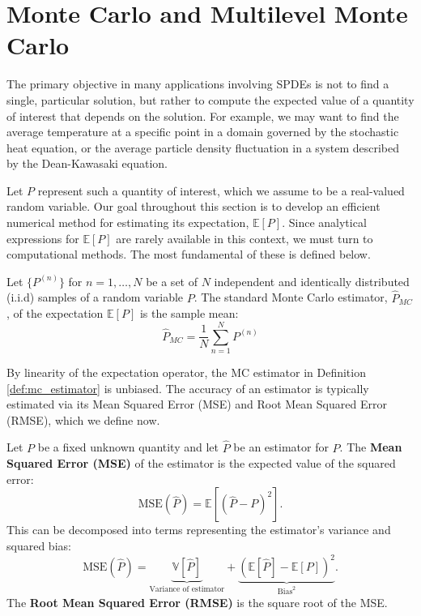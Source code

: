 \section{Monte Carlo and Multilevel Monte Carlo}\label{sec:intro_mlmc}

The primary objective in many applications involving SPDEs is not to find 
a single, particular solution, but rather to compute the expected value of a quantity of 
interest that depends on the solution. For example, we may 
want to find the average temperature at a specific point in a domain 
governed by the stochastic heat equation, or the average particle density fluctuation
in a system described by the Dean-Kawasaki equation.

Let $P$ represent such a quantity of interest, which we assume to be a real-valued 
random variable. Our goal throughout this section is to develop an efficient numerical
method for estimating its expectation, $\mathbb{E}[P]$. Since 
analytical expressions for $\mathbb{E}[P]$ are rarely available in this context, we must 
turn to computational methods. The most fundamental of these is defined below.

\begin{definition}\label{def:mc_estimator}
    Let $\{P^{(n)}\}$ for $n = 1, \dots, N$ be a set of $N$ independent and identically
    distributed (i.i.d) samples of a random variable $P$. The standard Monte Carlo estimator,
    $\hat{P}_{MC}$, of the expectation $\mathbb{E}[P]$ is the sample mean:
    \[
    \hat{P}_{MC} = \frac{1}{N} \sum_{n=1}^N P^{(n)}
    \]
\end{definition}

By linearity of the expectation operator, the MC estimator in Definition \ref{def:mc_estimator} 
is unbiased. The accuracy of an estimator is typically estimated via its Mean Squared Error (MSE) and 
Root Mean Squared Error (RMSE), which we define now.

\begin{definition}\label{def:mse_rmse}
    Let $P$ be a fixed unknown quantity and let $\hat{P}$ be an estimator for $P$. 
    The \textbf{Mean Squared Error (MSE)} of the estimator is the expected value of 
    the squared error:
    \[
    \text{MSE}(\hat{P}) = \mathbb{E}[(\hat{P} - P)^2].
    \]
    This can be decomposed into terms representing the estimator's variance and squared bias:
    \[
    \text{MSE}(\hat{P}) = \underbrace{\mathbb{V}[\hat{P}]}_{\text{Variance of estimator}}
    + \underbrace{(\mathbb{E}[\hat{P}] - \mathbb{E}[P])^2}_{\text{Bias}^2}.
    \]
    The \textbf{Root Mean Squared Error (RMSE)} is the square root of the MSE.
\end{definition}

